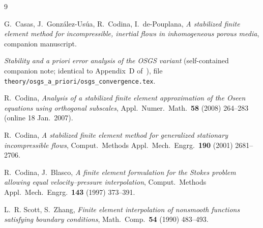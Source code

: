 \documentclass[11pt]{article}
\theoremstyle{remark}
\begin{document}
\begin{thebibliography}{9}

G.~Casas, J.~Gonz\'alez-Us\'ua, R.~Codina, I.~de-Pouplana,
\emph{A stabilized finite element method for incompressible, inertial flows in
inhomogeneous porous media}, companion manuscript.

\emph{Stability and a priori error analysis of the OSGS variant} (self-contained companion
note; identical to Appendix~D of~\cite{companion}), file
\texttt{theory/osgs\_a\_priori/osgs\_convergence.tex}.

R.~Codina,
\emph{Analysis of a stabilized finite element approximation of the Oseen equations using
orthogonal subscales},
Appl.\ Numer.\ Math.\ \textbf{58} (2008) 264--283 (online 18 Jan.\ 2007).

R.~Codina,
\emph{A stabilized finite element method for generalized stationary incompressible flows},
Comput.\ Methods Appl.\ Mech.\ Engrg.\ \textbf{190} (2001) 2681--2706.

R.~Codina, J.~Blasco,
\emph{A finite element formulation for the Stokes problem allowing equal velocity--pressure
interpolation},
Comput.\ Methods Appl.\ Mech.\ Engrg.\ \textbf{143} (1997) 373--391.

L.~R. Scott, S.~Zhang,
\emph{Finite element interpolation of nonsmooth functions satisfying boundary conditions},
Math.\ Comp.\ \textbf{54} (1990) 483--493.

\end{thebibliography}
\end{document}
